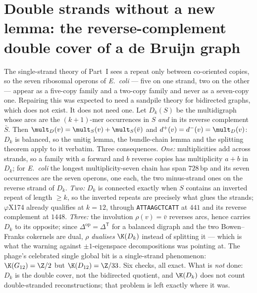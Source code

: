 \chapter[The reverse-complement double cover]{Double strands without a new lemma: the reverse-complement double cover of a de Bruijn graph}\label{chap:ch05}
\begin{chaptersummary}
The single-strand theory of Part~I sees a repeat only between co-oriented
copies, so the seven ribosomal operons of \emph{E.\ coli} --- five on one strand, two on
the other --- appear as a five-copy family and a two-copy family and never as a
seven-copy one. Repairing this was expected to need a sandpile theory for bidirected
graphs, which does not exist. It does not need one. Let $D_k(S)$ be the multidigraph
whose arcs are the $(k{+}1)$-mer occurrences in $S$ \emph{and} in its reverse complement
$\bar S$. Then $\mult_D(v)=\mult_S(v)+\mult_S(\bar v)$ and
$d^{+}(v)=d^{-}(v)=\mult_D(v)$: $D_k$ is balanced, so the unitig lemma, the bundle-chain
lemma and the splitting theorem apply to it verbatim. Three consequences. \emph{One:}
multiplicities add across strands, so a family with $a$ forward and $b$ reverse copies has
multiplicity $a+b$ in $D_k$; for \emph{E.\ coli} the longest multiplicity-seven chain has
span $728$\,bp and its seven occurrences are the seven operons, one each, the two
minus-strand ones on the reverse strand of $D_k$. \emph{Two:} $D_k$ is connected exactly
when $S$ contains an inverted repeat of length $\ge k$, so the inverted repeats are
precisely what glues the strands; $\varphi$X174 already qualifies at $k=12$, through
\texttt{ATTAAGCTCATT} at $441$ and its reverse complement at $1448$. \emph{Three:} the
involution $\rho(v)=\bar v$ reverses arcs, hence carries $D_k$ to its opposite; since
$\Delta^{\mathrm{op}}=\Delta^{\mathsf T}$ for a balanced digraph and the two Bowen--Franks
cokernels are dual, $\rho$ \emph{dualises} $\K(D_k)$ instead of splitting it --- which is
what the warning against $\pm1$-eigenspace decompositions was pointing at. The phage's
celebrated single global bit is a single-strand phenomenon: $\K(G_{12})=\Z/2$ but
$\K(D_{12})=\Z/33$. Six checks, all exact. What is \emph{not} done: $D_k$ is the double
cover, not the bidirected quotient, and $\K(D_k)$ does not count double-stranded
reconstructions; that problem is left exactly where it was.
\end{chaptersummary}

